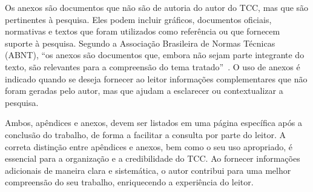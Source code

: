 

Os anexos são documentos que não são de autoria do autor do TCC, mas que são pertinentes à pesquisa. Eles podem incluir gráficos, documentos oficiais, normativas e textos que foram utilizados como referência ou que fornecem suporte à pesquisa. Segundo a Associação Brasileira de Normas Técnicas (ABNT), ``os anexos são documentos que, embora não sejam parte integrante do texto, são relevantes para a compreensão do tema tratado''~\cite{abnt2012}. O uso de anexos é indicado quando se deseja fornecer ao leitor informações complementares que não foram geradas pelo autor, mas que ajudam a esclarecer ou contextualizar a pesquisa.

Ambos, apêndices e anexos, devem ser listados em uma página específica após a conclusão do trabalho, de forma a facilitar a consulta por parte do leitor. A correta distinção entre apêndices e anexos, bem como o seu uso apropriado, é essencial para a organização e a credibilidade do TCC. Ao fornecer informações adicionais de maneira clara e sistemática, o autor contribui para uma melhor compreensão do seu trabalho, enriquecendo a experiência do leitor.
